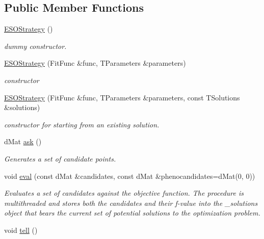 \subsection*{Public Member Functions}
\begin{DoxyCompactItemize}
\item 
\hypertarget{classlibcmaes_1_1ESOStrategy_aeae9653bf7cec51980c239200ad5c3df}{\hyperlink{classlibcmaes_1_1ESOStrategy_aeae9653bf7cec51980c239200ad5c3df}{E\+S\+O\+Strategy} ()}\label{classlibcmaes_1_1ESOStrategy_aeae9653bf7cec51980c239200ad5c3df}

\begin{DoxyCompactList}\small\item\em dummy constructor. \end{DoxyCompactList}\item 
\hyperlink{classlibcmaes_1_1ESOStrategy_a3736c9ce43cf708675229ff7b3ae4166}{E\+S\+O\+Strategy} (Fit\+Func \&func, T\+Parameters \&parameters)
\begin{DoxyCompactList}\small\item\em constructor \end{DoxyCompactList}\item 
\hyperlink{classlibcmaes_1_1ESOStrategy_abb06d0491f0240f875f66e9a4863f467}{E\+S\+O\+Strategy} (Fit\+Func \&func, T\+Parameters \&parameters, const T\+Solutions \&solutions)
\begin{DoxyCompactList}\small\item\em constructor for starting from an existing solution. \end{DoxyCompactList}\item 
d\+Mat \hyperlink{classlibcmaes_1_1ESOStrategy_af614d71ca3e8353b3027723220c9e3b4}{ask} ()
\begin{DoxyCompactList}\small\item\em Generates a set of candidate points. \end{DoxyCompactList}\item 
void \hyperlink{classlibcmaes_1_1ESOStrategy_a5e2e44bd0808efa95feea7ff5ef7eb91}{eval} (const d\+Mat \&candidates, const d\+Mat \&phenocandidates=d\+Mat(0, 0))
\begin{DoxyCompactList}\small\item\em Evaluates a set of candidates against the objective function. The procedure is multithreaded and stores both the candidates and their f-\/value into the \+\_\+solutions object that bears the current set of potential solutions to the optimization problem. \end{DoxyCompactList}\item 
\hypertarget{classlibcmaes_1_1ESOStrategy_ad35926877abdaed3922b316f57723612}{void \hyperlink{classlibcmaes_1_1ESOStrategy_ad35926877abdaed3922b316f57723612}{tell} ()}\label{classlibcmaes_1_1ESOStrategy_ad35926877abdaed3922b316f57723612}


\end{DoxyCompactItemize}
